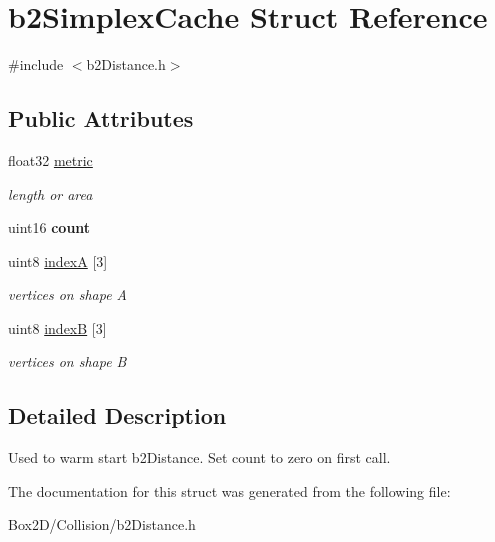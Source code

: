 \hypertarget{structb2_simplex_cache}{}\section{b2\+Simplex\+Cache Struct Reference}
\label{structb2_simplex_cache}


{\ttfamily \#include $<$b2\+Distance.\+h$>$}

\subsection*{Public Attributes}
\begin{DoxyCompactItemize}
\item 
\mbox{\label{structb2_simplex_cache_a018e0a500b417d79bfed3f21310b15a2}} 
float32 \hyperlink{structb2_simplex_cache_a018e0a500b417d79bfed3f21310b15a2}{metric}
\begin{DoxyCompactList}\small\item\em length or area \end{DoxyCompactList}\item 
\mbox{\label{structb2_simplex_cache_a5ef63839988cc06210ae76bcef96f56c}} 
uint16 {\bfseries count}
\item 
\mbox{\label{structb2_simplex_cache_ab574159e69dda7e14ead8de848ca6b67}} 
uint8 \hyperlink{structb2_simplex_cache_ab574159e69dda7e14ead8de848ca6b67}{indexA} \mbox{[}3\mbox{]}
\begin{DoxyCompactList}\small\item\em vertices on shape A \end{DoxyCompactList}\item 
\mbox{\label{structb2_simplex_cache_ab7586465ee2c5f7c3bdd8f80d5e256a7}} 
uint8 \hyperlink{structb2_simplex_cache_ab7586465ee2c5f7c3bdd8f80d5e256a7}{indexB} \mbox{[}3\mbox{]}
\begin{DoxyCompactList}\small\item\em vertices on shape B \end{DoxyCompactList}\end{DoxyCompactItemize}


\subsection{Detailed Description}
Used to warm start b2\+Distance. Set count to zero on first call. 

The documentation for this struct was generated from the following file\+:\begin{DoxyCompactItemize}
\item 
Box2\+D/\+Collision/b2\+Distance.\+h\end{DoxyCompactItemize}
